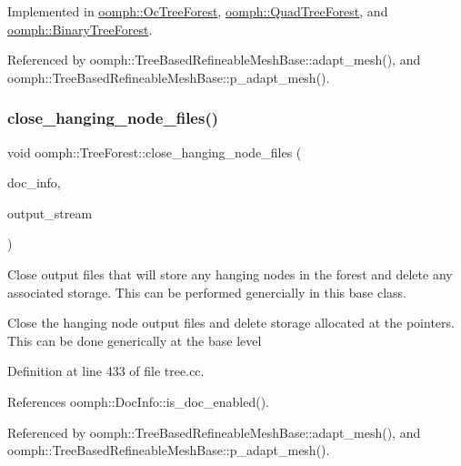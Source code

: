 Implemented in \hyperlink{classoomph_1_1OcTreeForest_a762eaa5790197e03146d42957c03b33e}{oomph\+::\+Oc\+Tree\+Forest}, \hyperlink{classoomph_1_1QuadTreeForest_a7ae708ced04343303be644f87cb1c169}{oomph\+::\+Quad\+Tree\+Forest}, and \hyperlink{classoomph_1_1BinaryTreeForest_a2e99234fcdc75760e00afb7d140c74ec}{oomph\+::\+Binary\+Tree\+Forest}.



Referenced by oomph\+::\+Tree\+Based\+Refineable\+Mesh\+Base\+::adapt\+\_\+mesh(), and oomph\+::\+Tree\+Based\+Refineable\+Mesh\+Base\+::p\+\_\+adapt\+\_\+mesh().

\mbox{\label{classoomph_1_1TreeForest_a6fc5f687654c86b2fed220fce085ef31}} 
\subsubsection{\texorpdfstring{close\+\_\+hanging\+\_\+node\+\_\+files()}{close\_hanging\_node\_files()}}
{\footnotesize\ttfamily void oomph\+::\+Tree\+Forest\+::close\+\_\+hanging\+\_\+node\+\_\+files (\begin{DoxyParamCaption}\item[{\hyperlink{classoomph_1_1DocInfo}{Doc\+Info} \&}]{doc\+\_\+info,  }\item[{\hyperlink{classoomph_1_1Vector}{Vector}$<$ std\+::ofstream $\ast$$>$ \&}]{output\+\_\+stream }\end{DoxyParamCaption})}



Close output files that will store any hanging nodes in the forest and delete any associated storage. This can be performed genercially in this base class. 

Close the hanging node output files and delete storage allocated at the pointers. This can be done generically at the base level 

Definition at line 433 of file tree.\+cc.



References oomph\+::\+Doc\+Info\+::is\+\_\+doc\+\_\+enabled().



Referenced by oomph\+::\+Tree\+Based\+Refineable\+Mesh\+Base\+::adapt\+\_\+mesh(), and oomph\+::\+Tree\+Based\+Refineable\+Mesh\+Base\+::p\+\_\+adapt\+\_\+mesh().

